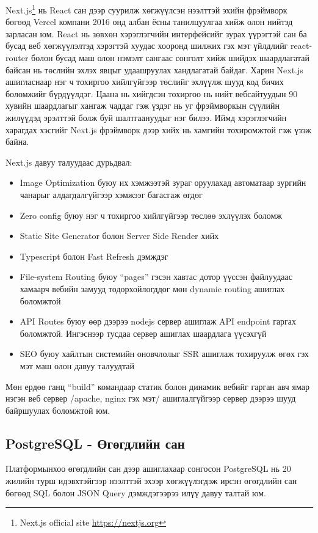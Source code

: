 Next.js\footnote{Next.js official site \url{https://nextjs.org}} нь React сан дээр суурилж хөгжүүлсэн нээлттэй эхийн фрэймворк бөгөөд Vercel компани 2016 онд албан ёсны танилцуулгаа хийж олон нийтэд зарласан юм. React нь зөвхөн хэрэглэгчийн интерфейсийг зурах үүрэгтэй сан ба бусад веб хөгжүүлэлтэд хэрэгтэй хуудас хооронд шилжих гэх мэт үйлдлийг react-router болон бусад маш олон нэмэлт сангаас сонголт хийж шийдэх шаардлагатай байсан нь төслийн эхлэх явцыг удаашруулах хандлагатай байдаг. Харин Next.js ашигласнаар нэг ч тохиргоо хийлгүйгээр төслийг эхлүүлж шууд код бичих боломжийг бүрдүүлдэг. Цаана нь хийгдсэн тохиргоо нь нийт вебсайтуудын 90 хувийн шаардлагыг хангаж чаддаг гэж үздэг нь уг фрэймворкын сүүлийн жилүүдэд эрэлттэй болж буй шалтгаануудыг нэг билээ. Иймд хэрэглэгчийн харагдах хэсгийг Next.js фрэймворк дээр хийх нь хамгийн тохиромжтой гэж үзэж байна.

Next.js давуу талуудаас дурьдвал:
\begin{itemize}
	\item Image Optimization буюу их хэмжээтэй зураг оруулахад автоматаар зургийн чанарыг алдагдалгүйгээр хэмжээг багасгаж өгдөг
	\item Zero config буюу нэг ч тохиргоо хийлгүйгээр төслөө эхлүүлэх боломж
	\item Static Site Generator болон Server Side Render хийх
	\item Typescript болон Fast Refresh дэмждэг
	\item File-system Routing буюу “pages” гэсэн хавтас дотор үүссэн файлуудаас хамаарч вебийн замууд тодорхойлогддог мөн dynamic routing ашиглах боломжтой
	\item API Routes буюу өөр дээрээ nodejs сервер ашиглаж API endpoint гаргах боломжтой. Ингэснээр тусдаа сервер ашиглах шаардлага үүсэхгүй 
	\item SEO буюу хайлтын системийн оновчлолыг SSR ашиглаж тохируулж өгөх гэх мэт маш олон давуу талуудтай
\end{itemize}

Мөн ердөө ганц “build” командаар статик болон динамик вебийг гарган авч ямар нэгэн веб сервер /apache, nginx гэх мэт/ ашиглалгүйгээр сервер дээрээ шууд байршуулах боломжтой юм.

\subsection{PostgreSQL - Өгөгдлийн сан}

Платформынхоо өгөгдлийн сан дээр ашиглахаар сонгосон PostgreSQL нь 20 жилийн турш идэвхтэйгээр нээлттэй эхээр хөгжүүлэгдэж ирсэн өгөгдлийн сан бөгөөд SQL болон JSON Query дэмждэгээрээ илүү давуу талтай юм. 

